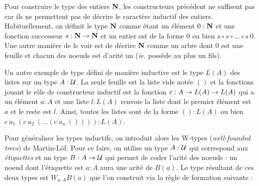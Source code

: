 \documentclass[../../rapport.tex]{subfiles}
\begin{document}
  Pour construire le type des entiers $\mathbf N$, les constructeurs précédent ne suffisent pas car ils ne permettent
  pas de décrire le caractère inductif des entiers.
  Habituellement, on définit le type $\mathbf N$ comme étant un élément $0 : \mathbf N$ et une fonction successeur
  $s : \mathbf N \rightarrow \mathbf N$ et un entier est de la forme $0$ ou bien $s\circ s \circ \hdots \circ s\ 0$.
  Une autre manière de le voir est de décrire $\mathbf N$ comme un arbre dont $0$ est une feuille et
  chacun des noeuds est d'arité un (\textit{ie.} possède au plus un fils).

  \begin{figure}[ht]
    \centering
  \end{figure}

  Un autre exemple de type défini de manière inductive est le type $L(A)$ des listes sur un type $A : \mathcal U$.
  La seule feuille est la liste vide notée $()$ et la fonctions jouant le rôle de constructeur inductif est
  la fonction $c : A \rightarrow L(A) \rightarrow L(A)$ qui a un élément $a : A$ et une liste $l : L(A)$ renvoie la liste
  dont le premier élément est $a$ et le reste est $l$.
  Ainsi, toutes les listes sont de la forme $() : L(A)$ ou bien $c\ a_1\ (c\ a_2\ (\hdots (c\ a_n\ ()))) :L(A)$.

  \begin{figure}[ht]
    \centering
  \end{figure}

  Pour généraliser les types inductifs, on introduit alors les W-types (\textit{well-founded trees}) de Martin-Löf.
  Pour ce faire, on utilise un type $A : \mathcal U$ qui correspond aux \textit{étiquettes} et un type $B : A \rightarrow \mathcal U$ qui
  permet de coder l'arité des noeuds : un noeud dont l'étiquette est $a : A$ aura une arité de $B(a)$.
  Le type résultant de ces deux types est $W_{a:A} B(a)$ que l'on construit via la règle de formation suivante :
\end{document}
